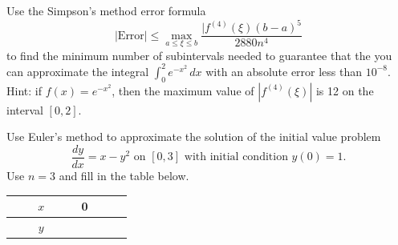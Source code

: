 \documentclass[11pt]{exam}
\newcommand{\ds}{\displaystyle}
\begin{document}
\begin{questions}

\newpage

\question Use the Simpson's method error formula 
$$|\text{Error}| \le \max_{a \le \xi \le b} \frac{|f^{(4)}(\xi)(b-a)^5}{2880 n^4}$$
to find the minimum number of subintervals needed to guarantee that the you can approximate the integral $\int_0^2 e^{-x^2} \, dx$ with an absolute error less than $10^{-8}$. Hint: if $f(x) = e^{-x^2}$, then the maximum value of $|f^{(4)}(\xi)|$ is 12 on the interval $[0,2]$.  


\begin{solution}
\end{solution}
\vfill

\question Use Euler's method to approximate the solution of the initial value problem 
$$\ds \frac{dy}{dx} = x - y^2 \text{ on } [0,3] \text{ with initial condition } y(0) = 1.$$  
Use $n=3$ and fill in the table below.

\begin{center}
\renewcommand{\arraystretch}{2.0}
\begin{tabular}{|c|c|c|c|c|}
\hline
~~~~$x$~~~~ & 0 &  \hspace*{0.8in} & \hspace*{0.8in} & \hspace*{0.8in} \\ \hline
$y$ & \hspace*{0.8in}  & & & \\ \hline
\end{tabular}
\end{center}

\begin{solution}
\end{solution}
\vfill


\end{questions}
\end{document}
